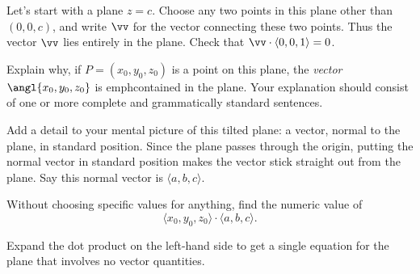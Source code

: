 \documentclass[12pt]{exam}
\theoremstyle{definition}
\begin{document}
\begin{questions}

\question Let's start with a plane $z = c$. Choose any two points in this plane
other than $(0,0,c)$, and write $\vv$ for the vector connecting these two
points. Thus the vector $\vv$ lies entirely in the plane. Check that $\vv \cdot
\langle 0, 0, 1 \rangle = 0$.


\question Explain why, if $P = (x_0, y_0, z_0)$ is a point on this plane, the
\emph{vector} $\angl{x_0, y_0, z_0}$ is emph{contained} in the plane.
Your explanation should consist of one or more complete and grammatically
standard sentences.

\question Add a detail to your mental picture of this tilted plane: a vector,
normal to the plane, in standard position. Since the plane passes through the
origin, putting the normal vector in standard position makes the vector stick
straight out from the plane. Say this normal vector is $\langle a, b, c
\rangle$.

\question  Without choosing specific values for anything, find the numeric value
of 
\begin{equation*}
    \langle x_0, y_0, z_0 \rangle \cdot \langle a, b, c \rangle.
\end{equation*}

\question Expand the dot product on the left-hand side to get a single equation
for the plane that involves no vector quantities.



\end{questions}
\end{document}
